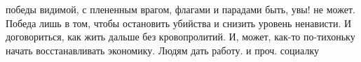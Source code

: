  
 
 
 
 

\begin{cmtfront}
\large{}

победы видимой, с плененным врагом, флагами и парадами быть, увы! не может.
Победа лишь в том, чтобы остановить убийства и снизить уровень ненависти. И
договориться, как жить дальше без кровопролитий. И, может, как-то по-тихоньку
начать восстанавливать экономику. Людям дать работу. и проч. социалку

\end{cmtfront}
